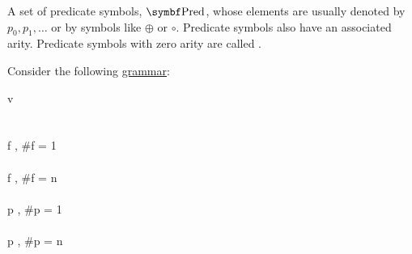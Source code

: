 \begin{definition}
\begin{description}
\begin{DefEnum}[resume=def:first_order_logic_alphabet]
       A set of predicate symbols, \( \Bold{Pred} \), whose elements are usually denoted by \( p_0, p_1, \ldots \) or by symbols like \( \oplus \) or \( \circ \). Predicate symbols also have an associated arity. Predicate symbols with zero arity are called .
    \end{DefEnum}
  \end{description}
\end{definition}

\begin{definition}\label{def:first_order_language}\mbox{}
  \begin{DefEnum}
     Consider the following \hyperref[def:grammar]{grammar}:
    \begin{bnf*}
              {v \in {}} \\
            {\circ \in \Sigma} \\
            {\bnfts{\( \forall \)} \bnfor \bnfts{\( \exists \)}} \\
        {f \in {}, \#f = 1} \\
      \bnfmore                  {\vdots} \\
        {f \in {}, \#f = n } \\
      \bnfmore                  {\vdots} \\
       {p \in {}, \#p = 1} \\
      \bnfmore                  {\vdots} \\
       {p \in {}, \#p = n } \\
      \bnfmore                  {\vdots} \\
                  { \bnfor} \\
       \\
      \bnfmore                  {\hspace{3cm} \vdots} \\
       \\

\end{bnf*}
\end{DefEnum}
\end{definition}
